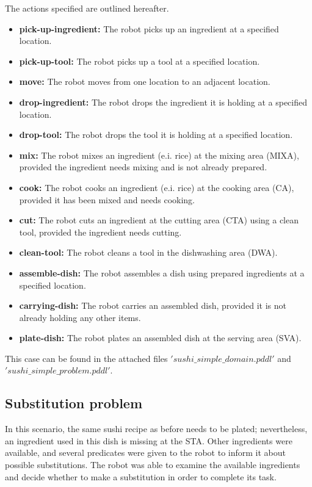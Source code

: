 The actions specified are outlined hereafter.
\begin{itemize}
    \item \textbf{pick-up-ingredient:} The robot picks up an ingredient at a specified location.
    \item \textbf{pick-up-tool:} The robot picks up a tool at a specified location.
    \item \textbf{move:} The robot moves from one location to an adjacent location.
    \item \textbf{drop-ingredient:} The robot drops the ingredient it is holding at a specified location.
    \item \textbf{drop-tool:} The robot drops the tool it is holding at a specified location.
    \item \textbf{mix:} The robot mixes an ingredient (e.i. rice) at the mixing area (MIXA), provided the ingredient needs mixing and is not already prepared.
    \item \textbf{cook:} The robot cooks an ingredient (e.i. rice) at the cooking area (CA), provided it has been mixed and needs cooking.
    \item \textbf{cut:} The robot cuts an ingredient at the cutting area (CTA) using a clean tool, provided the ingredient needs cutting.
    \item \textbf{clean-tool:} The robot cleans a tool in the dishwashing area (DWA).
    \item \textbf{assemble-dish:} The robot assembles a dish using prepared ingredients at a specified location.
    \item \textbf{carrying-dish:} The robot carries an assembled dish, provided it is not already holding any other items.
    \item \textbf{plate-dish:} The robot plates an assembled dish at the serving area (SVA).
\end{itemize}


This case can be found in the attached files $'sushi\_simple\_domain.pddl'$ and $'sushi\_simple\_problem.pddl'$.

\subsection{Substitution problem}
In this scenario, the same sushi recipe as before needs to be plated; nevertheless, an ingredient used in this dish is missing at the 
STA. Other ingredients were available, and several predicates were given to the robot to inform it about possible substitutions. 
The robot was able to examine the available ingredients and decide whether to make a substitution in order to complete its task. 


